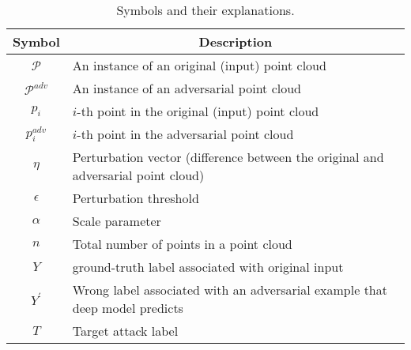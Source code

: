 \documentclass{ieeeaccess}
\begin{document}
\begin{table*}
\caption{
{Symbols and their explanations.}}
\centering
\label{table:Symbols}
\begin{tabular}{| c  | l |  }
\hline

\multicolumn{1}{|c|}{\bf Symbol}  & \multicolumn{1}{c|}{\bf Description}\\
\hline


$\mathcal{P}$ &  An instance of an original (input) point cloud \\

$\mathcal{P}^{adv}$ &  An instance of an adversarial point cloud \\




$p_i$ &  $i$-th point in the original (input) point cloud \\

$p^{adv}_i$ &  $i$-th point in the adversarial point cloud \\

$\eta$ &  Perturbation vector (difference between the original and adversarial point cloud) \\

$\epsilon$ & Perturbation threshold %
\\

$\alpha$ &   Scale parameter %
\\


$n$ &  Total number of points in a point cloud \\

$Y$ & ground-truth label associated with original input \\
$Y^{\prime}$ &  Wrong label associated with an adversarial example that deep model predicts \\
$T$ & Target attack label\\


\end{tabular}
\end{table*}
\end{document}
